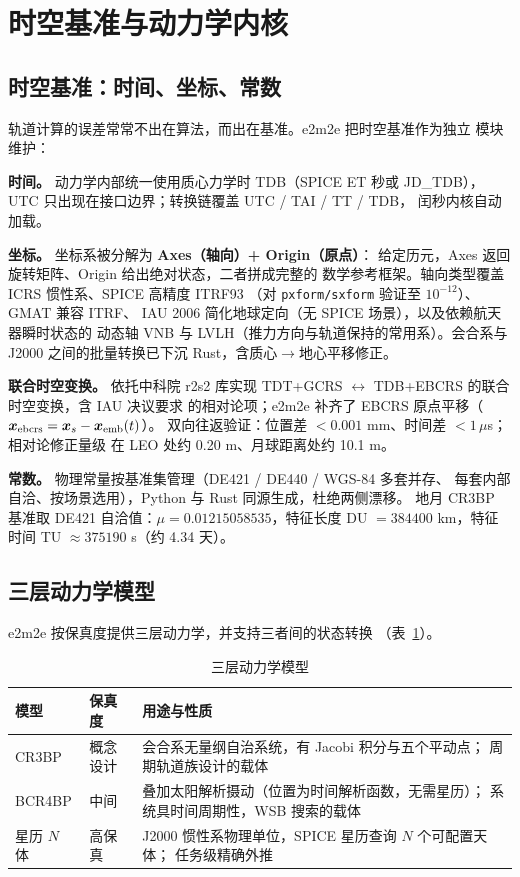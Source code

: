 \section{时空基准与动力学内核}
\label{sec:dynamics}

\subsection{时空基准：时间、坐标、常数}

轨道计算的误差常常不出在算法，而出在基准。e2m2e 把时空基准作为独立
模块维护：

\textbf{时间。} 动力学内部统一使用质心力学时 TDB（SPICE ET 秒或
JD\_TDB），UTC 只出现在接口边界；转换链覆盖 UTC / TAI / TT / TDB，
闰秒内核自动加载。

\textbf{坐标。} 坐标系被分解为 \textbf{Axes（轴向）+ Origin（原点）}：
给定历元，Axes 返回旋转矩阵、Origin 给出绝对状态，二者拼成完整的
数学参考框架。轴向类型覆盖 ICRS 惯性系、SPICE 高精度 ITRF93
（对 \texttt{pxform/sxform} 验证至 $10^{-12}$）、GMAT 兼容 ITRF、
IAU 2006 简化地球定向（无 SPICE 场景），以及依赖航天器瞬时状态的
动态轴 VNB 与 LVLH（推力方向与轨道保持的常用系）。会合系与 J2000
之间的批量转换已下沉 Rust，含质心$\to$地心平移修正。

\textbf{联合时空变换。} 依托中科院 r2s2 库实现
TDT+GCRS $\leftrightarrow$ TDB+EBCRS 的联合时空变换，含 IAU 决议要求
的相对论项；e2m2e 补齐了 EBCRS 原点平移（
$\bm{x}_{\mathrm{ebcrs}} = \bm{x}_s - \bm{x}_{\mathrm{emb}}(t)$）。
双向往返验证：位置差 $< 0.001$ mm、时间差 $< 1\,\mu$s；相对论修正量级
在 LEO 处约 0.20 m、月球距离处约 10.1 m。

\textbf{常数。} 物理常量按基准集管理（DE421 / DE440 / WGS-84 多套并存、
每套内部自洽、按场景选用），Python 与 Rust 同源生成，杜绝两侧漂移。
地月 CR3BP 基准取 DE421 自洽值：$\mu = 0.01215058535$，特征长度
DU $= 384400$ km，特征时间 TU $\approx 375190$ s（约 4.34 天）。

\subsection{三层动力学模型}

e2m2e 按保真度提供三层动力学，并支持三者间的状态转换
（表~\ref{tab:dynamics}）。

\begin{table}[htbp]
\centering\small
\caption{三层动力学模型}
\label{tab:dynamics}
\begin{tabularx}{\textwidth}{@{}llX@{}}
\toprule
\textbf{模型} & \textbf{保真度} & \textbf{用途与性质} \\
\midrule
CR3BP & 概念设计 & 会合系无量纲自治系统，有 Jacobi 积分与五个平动点；
周期轨道族设计的载体 \\
BCR4BP & 中间 & 叠加太阳解析摄动（位置为时间解析函数，无需星历）；
系统具时间周期性，WSB 搜索的载体 \\
星历 $N$ 体 & 高保真 & J2000 惯性系物理单位，SPICE 星历查询 $N$ 个可配置天体；
任务级精确外推 \\
\bottomrule
\end{tabularx}
\end{table}

